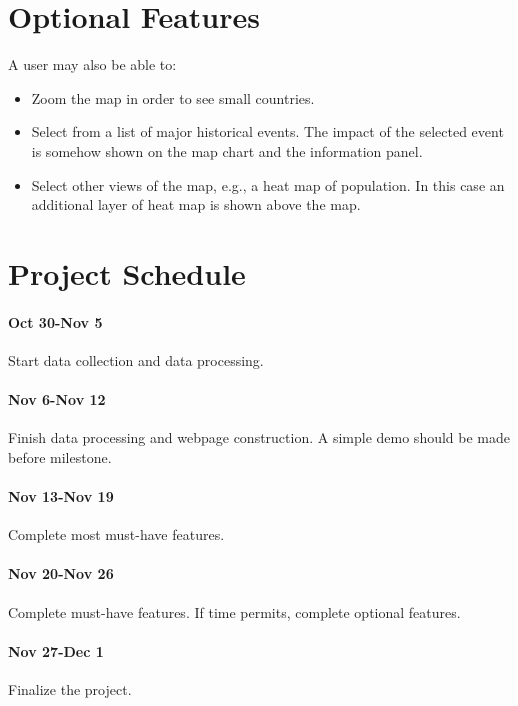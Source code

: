 \documentclass[12pt, fullpage,letterpaper]{article}
\begin{document}
\section{Optional Features}
A user may also be able to:
\begin{itemize}
    \item Zoom the map in order to see small countries.
    \item Select from a list of major historical events. The impact of the selected event is somehow shown on the map chart and the information panel.
    \item Select other views of the map, e.g., a heat map of population. In this case an additional layer of heat map is shown above the map.
\end{itemize}

\section{Project Schedule}
\paragraph{Oct 30-Nov 5} Start data collection and data processing.
\paragraph{Nov 6-Nov 12} Finish data processing and webpage construction. A simple demo should be made before milestone.
\paragraph{Nov 13-Nov 19} Complete most must-have features.
\paragraph{Nov 20-Nov 26} Complete must-have features. If time permits, complete optional features.
\paragraph{Nov 27-Dec 1} Finalize the project.
\end{document}
